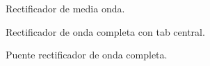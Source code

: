 \begin{figure}[!t]
  \centering
  \resizebox{0.55\columnwidth}{!}{}
  \caption{Rectificador de media onda.}
  \label{fig:gen_media}
\end{figure}

\begin{figure}[!t]
  \centering
  \resizebox{\columnwidth}{!}{}
  \caption{Rectificador de onda completa con tab central.}
  \label{fig:gen_tab}
\end{figure}

\begin{figure}[!t]
  \centering
  \resizebox{0.75\columnwidth}{!}{}
  \caption{Puente rectificador de onda completa.}
  \label{fig:gen_puente}
\end{figure}
